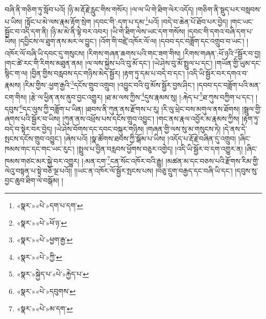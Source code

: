 བཞི་ནི་གཅིག་ཏུ་སློབ་པའོ། །ཉི་མ་རྡོ་རྗེ་རླུང་གིས་གསོར། །ལ་ལ་ཡི་གེ་ཐིག་ལེར་འདོད། །གཅིག་ནི་སྡུད་པར་བསླབས་པ་ཡིས། །སྟོང་པ་མེ་ལས་རྣམ་རྟོག་སྲེག །དབང་གི་:དག་པ་དམ་\footnote{«སྣར་»«པེ་»དག་པ་དག་}པའོ། །བདེ་བ་ཆེན་པོ་ཐོབ་པར་བྱེད། །གང་ཡང་སྦྱོང་བ་འདི་དག་ནི། །ཉི་མ་མེ་ནི་ལྟེ་བར་འབར། །ཡི་གེ་ཐིག་ལེས་ཡང་དག་གསོས། །དབང་གི་དགའ་བཞི་དག་པ་ཡིས། །དབྱིངས་ལ་ཐུག་ནས་མར་ལ་བྱུང་། །འོག་གི་བཛྲེ་འཁོར་ལོ་ལ། །དབབ་དང་བཟློག་དང་འགྲུབ་བ་ཡང་། །འཁོར་ལོ་བཞི་ཡི་དབང་དུ་གསུངས། །རིགས་གཞན་ཆགས་པའི་གང་ཟག་གིས། །རིགས་གཞན་:ཕོ་ཉའི་\footnote{«སྣར་»«པེ་»ཕོ་ཉ་}སྦྱོར་བ་བྱ། །གང་ཚེ་རང་གི་རིགས་མཐུན་ནམ། །ལ་ལས་སྐྱེས་པའི་བུ་མོ་དང་། །ཡེ་ཤེས་བུ་མོ་སྤྲུལ་པ་དང་། །གཡོན་གྱི་ཡུམ་དང་སྙིང་ག་ལ། །བྱིན་གྱིས་བརླབས་དང་གཉིས་མེད་སྦྱོར། །རྟག་ཏུ་དམ་པ་བདེ་བ་དང་། །འདི་ཡི་སྦྱོར་བར་དགའ་བ་རྣམས། །རིམ་གྱིས་:ཕྱག་རྒྱའི་\footnote{«སྣར་»«པེ་»ཕྱག་རྒྱ་}དངོས་གྲུབ་འགྲུབ། །འབྱུང་བའི་བུ་མོས་སྦྱོར་བྱས་ཤིང་། །དབབ་དང་བཟློག་པའི་མན་ངག་གིས། །རྩེ་ལ་ཕྱིན་ནས་ནུབ་བྱང་འགྱུར། །ཐ་མ་ལས་ཀྱིས་\footnote{«སྣར་»«པེ་»ཀྱི་}དུས་རྣམས་སུ། །:རྐེད་པ་\footnote{«སྣར་»སྐྱེད་པ་«པེ་»རྐྱེད་པ་}ཐ་ཀུས་བཀྱིག་པ་དང་། །དབུས་\footnote{«སྣར་»«པེ་»དབུགས་}དང་ལུས་ཀྱི་བཟློག་པ་ཡིན། །ཐབས་ནི་ཀུན་ནས་རྫོགས་པ་རུ། །རི་ལུ་ཕྲེང་བས་མགུལ་ནས་ཐོགས། །སྦྲུལ་གྱི་ཞགས་པའི་སྦྱོར་བ་ཡིས། །ཀུན་ནས་འཕྲོས་པས་དངོས་གྲུབ་འབྱུང་། །གང་ནས་རྣལ་འབྱོར་མ་རྣམས་ཀྱིས། །རྟག་ཏུ་བདེ་བ་སྟེར་བར་བྱེད། །ཡེ་ཤེས་བོགས་དང་དབང་བསྐུར་གཉིས། །གཞན་གྱི་ལས་སུ་མ་གསུངས་ཏེ། །དེ་ནས་དེ་སྤངས་དངོས་གྲུབ་འབྱུང་། །ཞེས་པའོ། །སྣ་ཚོགས་ཐབས་ཀྱི་སྒོམ་པ་ཡིས། །འདོད་པ་རྡོ་རྗེ་བཞིན་དུ་འགྲུབ། །ཞིང་ཁམས་གང་དང་གང་ཡང་རུང་། །སྤྲུལ་པ་བྱིན་བརླབས་ཕྱོགས་བཅུར་འགྱེད། །འདི་ཡི་སྦྱོར་བ་དག་འགྱུར་ན། །ཞིང་ཁམས་གཙང་མར་སྐྱེ་བར་འགྱུར། །:མན་ངག་\footnote{«སྣར་»«པེ་»མ་དག་}ངན་སོང་འཁོར་བའི་རྒྱུ། །མཚན་མ་དང་བཅས་པའི་རྫོགས་རིམ་གྱི་ལེའུ་བསྟན་པ་སྟེ་བཅོ་ལྔ་པའོ།། །།ཡང་ན་འཁོར་ལོ་སྦྱོར་སྤངས་པས། །བཅུ་དྲུག་བརྒྱད་དང་བཞི་ཡི་དང་། །དབུས་སུ་བྱང་ཆུབ་ཐིག་ལེ་བསྒོམ། །
